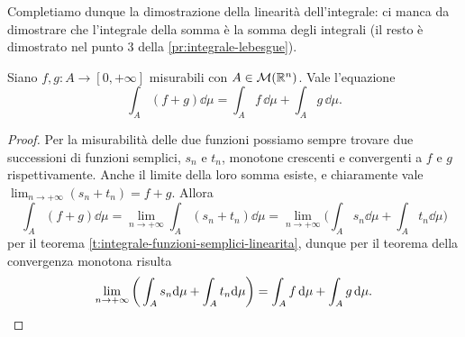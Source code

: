 Completiamo dunque la dimostrazione della linearità dell'integrale: ci manca da dimostrare che l'integrale della somma è la somma degli integrali (il resto è dimostrato nel punto 3 della \ref{pr:integrale-lebesgue}).
\begin{proprieta} \label{pr:linearita-integrale-lebesgue}
	Siano $f,g\colon A\to[0,+\infty]$ misurabili con $A\in\mathcal M(\mathbb{R}^n)$.
	Vale l'equazione
	\begin{equation}
		\int_A(f+g)\dd\mu=\int_Af\,\dd\mu+\int_Ag\,\dd\mu.
		\label{eq:linearita-integrale-lebesgue}
	\end{equation}
\end{proprieta}
\begin{proof}
	Per la misurabilità delle due funzioni possiamo sempre trovare due successioni di funzioni semplici, $s_n$ e $t_n$, monotone crescenti e convergenti a $f$ e $g$ rispettivamente.
	Anche il limite della loro somma esiste, e chiaramente vale $\lim_{n\to+\infty}(s_n+t_n)=f+g$.
	Allora
	\begin{equation}
		\int_A(f+g)\dd\mu=\lim_{n\to+\infty}\int_A(s_n+t_n)\dd\mu=\lim_{n\to+\infty}\bigg(\int_As_n\dd\mu+\int_At_n\dd\mu\bigg)
	\end{equation}
	per il teorema \ref{t:integrale-funzioni-semplici-linearita}, dunque per il teorema della convergenza monotona risulta
	\begin{equation}
		\lim_{n\to+\infty}\bigg(\int_As_n\textup{d}\mu+\int_At_n\textup{d}\mu\bigg)=\int_Af\,\textup{d}\mu+\int_Ag\,\textup{d}\mu.\qedhere
	\end{equation}
\end{proof}

